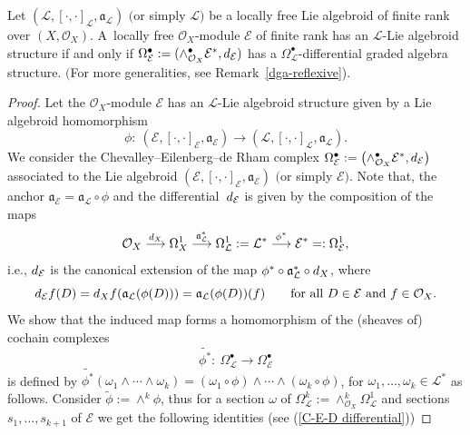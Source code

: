 \documentclass[10pt,a4paper]{amsart}
\begin{document}
\begin{Thm} \label{L-Lie alg & dga}
	Let $(\mathcal{L}, [\cdot, \cdot]_{\mathcal{L}}, \mathfrak{a}_{\mathcal{L}})$ $($or simply $\mathcal{L})$ be a locally free Lie algebroid of finite rank over $(X,\mathcal{O}_X)$.
	A~locally free $\mathcal{O}_X$-module $\mathcal{E}$ of finite rank has an $\mathcal{L}$-Lie algebroid structure if and only if $\Omega^{\bullet}_{\mathcal{E}}:=(\wedge^{\bullet}_{\mathcal{O}_X}\mathcal{E}^*,{\rm d}_{\mathcal{E}})$ has a $\Omega^{\bullet}_{\mathcal{L}}$-differential graded algebra structure. $($For more generalities, see Remark~{\rm \ref{dga-reflexive})}.
\end{Thm}

\begin{proof}
	Let the $\mathcal{O}_X$-module $\mathcal{E}$ has an $\mathcal{L}$-Lie algebroid structure given by a Lie algebroid homomorphism
\[
\phi\colon \ (\mathcal{E}, [\cdot, \cdot]_{\mathcal{E}}, \mathfrak{a}_{\mathcal{E}}) \rightarrow (\mathcal{L}, [\cdot, \cdot]_{\mathcal{L}}, \mathfrak{a}_{\mathcal{L}}).
\]
	We consider the Chevalley--Eilenberg--de Rham complex $\Omega^{\bullet}_{\mathcal{E}}:=\bigl(\wedge^{\bullet}_{\mathcal{O}_X}\mathcal{E}^*,{\rm d}_{\mathcal{E}}\bigr)$ associated to the Lie algebroid $(\mathcal{E}, [\cdot, \cdot]_{\mathcal{E}}, \mathfrak{a}_{\mathcal{E}})$ $($or simply $\mathcal{E})$. Note that, the anchor $\mathfrak{a}_{\mathcal{E}}=\mathfrak{a}_{\mathcal{L}} \circ \phi$ and the differential~${\rm d}_{\mathcal{E}}$ is given by the composition of the maps
\[
\mathcal{O}_X \overset{{\rm d}_X}{\longrightarrow}\Omega^1_X \overset{\mathfrak{a}_{\mathcal{L}}^*}{\longrightarrow} \Omega^1_{\mathcal{L}}:= \mathcal{L}^* \overset{\phi^*}{\longrightarrow} \mathcal{E}^*=:\Omega^1_{\mathcal{E}},
\]
 i.e., ${\rm d}_{\mathcal{E}}$ is the canonical extension of the map $\phi^* \circ \mathfrak{a}_{\mathcal{L}}^* \circ {\rm d}_X$, where
\[
{\rm d}_{\mathcal{E}}f (D)={\rm d}_Xf(\mathfrak{a}_{\mathcal{L}}(\phi(D)))= \mathfrak{a}_{\mathcal{L}}(\phi(D))(f)\qquad \text{for all $D \in \mathcal{E}$ and $f \in \mathcal{O}_X$}.
\]
We show that the induced map forms a homomorphism of the (sheaves of) cochain complexes
\[
\widetilde{\phi^*}\colon \ \Omega^{\bullet}_{\mathcal{L}} \rightarrow \Omega^{\bullet}_{\mathcal{E}}
\] is defined by
	$\widetilde{\phi^*}(\omega_1 \wedge \cdots \wedge \omega_k)= (\omega_1 \circ \phi )\wedge \cdots \wedge (\omega_k \circ \phi )$,
	for $\omega_1, \dots, \omega_k \in \mathcal{L}^*$ as follows. Consider $\tilde{\phi}:=\wedge^k \phi$, thus
	for a section $\omega$ of $ \Omega^{k}_{\mathcal{L}}:= \wedge^k_{\mathcal{O}_X} \Omega^{1}_{\mathcal{L}}$ and sections $s_1, \dots, s_{k+1}$ of $\mathcal{E}$ we get the following identities	(see (\ref{C-E-D differential}))	

\end{proof}
\end{document}
